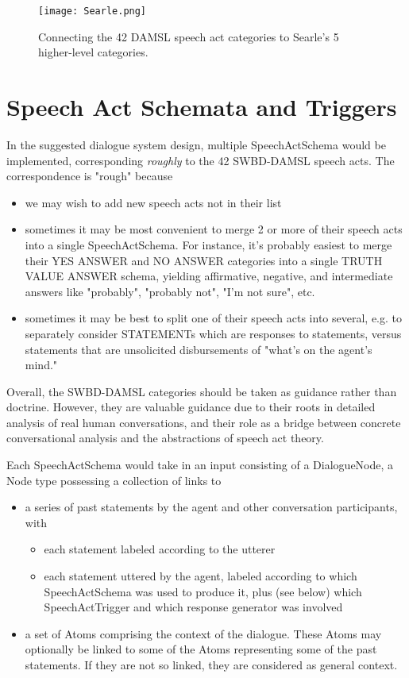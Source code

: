 \documentclass[10pt]{article}
\begin{document}
\begin{figure}[htb]
\centering
\texttt{[image: Searle.png]}
\caption{Connecting the 42 DAMSL speech act categories to Searle's 5 higher-level categories.}
\label{fig:Searle}
\end{figure}

\section{Speech Act Schemata and Triggers}

In the suggested dialogue system design, multiple SpeechActSchema would be implemented, corresponding {\it roughly} to the 42 SWBD-DAMSL speech acts.  The correspondence is "rough" because 

\begin{itemize}
\item we may wish to add new speech acts not in their list
\item sometimes it may be most convenient to merge 2 or more of their speech acts into a single SpeechActSchema.  For instance, it's probably easiest to merge their YES ANSWER and NO ANSWER categories into a single TRUTH VALUE ANSWER schema, yielding affirmative, negative, and intermediate answers like "probably", "probably not", "I'm not sure", etc.
\item sometimes it may be best to split one of their speech acts into several, e.g. to separately consider STATEMENTs which are responses to statements, versus statements that are unsolicited disbursements of "what's on the agent's mind."
\end{itemize}

\noindent  Overall, the SWBD-DAMSL categories should be taken as guidance rather than doctrine.  However, they are valuable guidance due to their roots in detailed analysis of real human conversations, and their role as a bridge between concrete conversational analysis and the abstractions of speech act theory.

Each SpeechActSchema would  take in an input consisting of a DialogueNode, a Node type possessing a collection of links to

\begin{itemize}
\item a series of past statements by the agent and other conversation participants, with
\begin{itemize}
\item  each statement labeled according to the utterer
\item each statement uttered by the agent, labeled according to which SpeechActSchema was used to produce it, plus (see below) which SpeechActTrigger and which response generator was involved
\end{itemize}
\item a set of Atoms comprising the context of the dialogue.   These Atoms may optionally be linked to some of the Atoms representing some of the past statements.  If they are not so linked, they are considered as general context.
\end{itemize}
\end{document}
